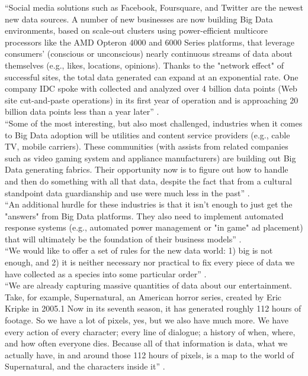 \documentclass[sigconf]{acmart}
\begin{document}
``Social media solutions such as Facebook, Foursquare, and Twitter are the newest new data sources. A number of new businesses are now building Big Data environments, based on scale-out clusters using power-efficient multicore processors like the AMD Opteron 4000 and 6000 Series platforms, that leverage consumers' (conscious or unconscious) nearly continuous streams of data about themselves (e.g., likes, locations, opinions). Thanks to the "network effect" of successful sites, the total data generated can expand at an exponential rate. One company IDC spoke with collected and analyzed over 4 billion data points (Web site cut-and-paste operations) in its first year of operation and is approaching 20 billion data points less than a year later'' \cite{Villars2011care}. \\
``Some of the most interesting, but also most challenged, industries when it comes to Big Data adoption will be utilities and content service providers (e.g., cable TV, mobile carriers). These communities (with assists from related companies such as video gaming system and appliance manufacturers) are building out Big Data generating fabrics. Their opportunity now is to figure out how to handle and then do something with all that data, despite the fact that from a cultural standpoint data guardianship and use were much less in the past'' \cite{Villars2011care}. \\
``An additional hurdle for these industries is that it isn't enough to just get the "answers" from Big Data platforms. They also need to implement automated response systems (e.g., automated power management or "in game" ad placement) that will ultimately be the foundation of their business models'' \cite{Villars2011care}. \\
``We would like to offer a set of rules for the new data world: 1) big is not enough, and 2) it is neither necessary nor practical to fix every piece of data we have collected as a species into some particular order'' \cite{Schlieski2012data}. \\
``We are already capturing massive quantities of data about our entertainment. Take, for example, Supernatural, an American horror series, created by Eric Kripke in 2005.1 Now in its seventh season, it has generated roughly 112 hours of footage. So we have a lot of pixels, yes, but we also have much more. We have every action of every character; every line of dialogue; a history of when, where, and how often everyone dies. Because all of that information is data, what we actually have, in and around those 112 hours of pixels, is a map to the world of Supernatural, and the characters inside it'' \cite{Schlieski2012data}. \\
\end{document}
